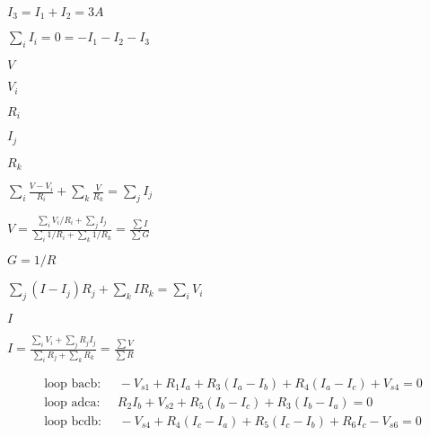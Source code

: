 \documentclass{article}
\def\lthtmlcheckvsize{\ifdim\ht\sizebox<\vsize 
  \ifdim\wd\sizebox<\hsize\expandafter\hfill\fi \expandafter\vfill
  \else\expandafter\vss\fi}%
\begin{document}
{\newpage\clearpage
{}%
$ I_3=I_1+I_2=3A$%
\lthtmlindisplaymathZ
\lthtmlcheckvsize\clearpage}

{\newpage\clearpage
{}%
$ \sum_i I_i=0=-I_1-I_2-I_3$%
\lthtmlindisplaymathZ
\lthtmlcheckvsize\clearpage}

{\newpage\clearpage
{}%
$ V$%
\lthtmlindisplaymathZ
\lthtmlcheckvsize\clearpage}

{\newpage\clearpage
{}%
$ V_i$%
\lthtmlindisplaymathZ
\lthtmlcheckvsize\clearpage}

{\newpage\clearpage
{}%
$ R_i$%
\lthtmlindisplaymathZ
\lthtmlcheckvsize\clearpage}

{\newpage\clearpage
{}%
$ I_j$%
\lthtmlindisplaymathZ
\lthtmlcheckvsize\clearpage}

{\newpage\clearpage
{}%
$ R_k$%
\lthtmlindisplaymathZ
\lthtmlcheckvsize\clearpage}

{\newpage\clearpage
{}%
$\displaystyle \sum_i \frac{V-V_i}{R_i}+\sum_k \frac{V}{R_k}=\sum_j I_j$%
\lthtmlindisplaymathZ
\lthtmlcheckvsize\clearpage}

{\newpage\clearpage
{}%
$\displaystyle V=\frac{\sum_i V_i/R_i+\sum_j I_j}{\sum_i 1/R_i+\sum_k 1/R_k}=\frac{\sum I}{\sum G}$%
\lthtmlindisplaymathZ
\lthtmlcheckvsize\clearpage}

{\newpage\clearpage
{}%
$ G=1/R$%
\lthtmlindisplaymathZ
\lthtmlcheckvsize\clearpage}

{\newpage\clearpage
{}%
$\displaystyle \sum_j (I-I_j)R_j+\sum_k I R_k=\sum_i V_i$%
\lthtmlindisplaymathZ
\lthtmlcheckvsize\clearpage}

{\newpage\clearpage
{}%
$ I$%
\lthtmlindisplaymathZ
\lthtmlcheckvsize\clearpage}

{\newpage\clearpage
{}%
$\displaystyle I=\frac{\sum_i V_i+\sum_j R_jI_j}{\sum_i R_j+\sum_k R_k}=\frac{\sum V}{\sum R}$%
\lthtmlindisplaymathZ
\lthtmlcheckvsize\clearpage}

{\newpage\clearpage
{}%
\begin{displaymath}\begin{array}{l}
\mbox{loop bacb:}\;\;\;\;\;-V_{s1}+R_1I_a+R_3(I_a-I_b)+R_4(I_a-I_c)+V_{s4}=0 \\
\mbox{loop adca:}\;\;\;\;\;R_2I_b+V_{s2}+R_5(I_b-I_c)+R_3(I_b-I_a)=0 \\
\mbox{loop bcdb:}\;\;\;\;\;-V_{s4}+R_4(I_c-I_a)+R_5(I_c-I_b)+R_6I_c-V_{s6}=0
\end{array}\end{displaymath}%
\lthtmldisplayZ
\lthtmlcheckvsize\clearpage}
\end{document}

